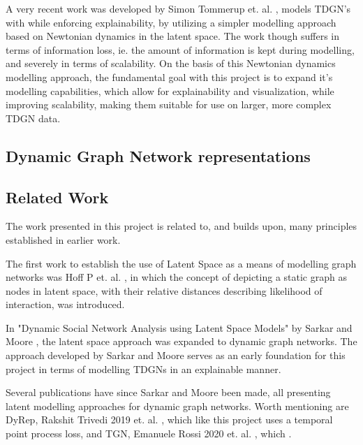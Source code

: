 A very recent work was developed by Simon Tommerup et. al. \cite{Tommerup2021LearningNetworks}, models TDGN's with while enforcing explainability, by utilizing a simpler modelling approach based on Newtonian dynamics in the latent space.
The work though suffers in terms of information loss, ie. the amount of information is kept during modelling, and severely in terms of scalability.
On the basis of this Newtonian dynamics modelling approach, the fundamental goal with this project is to expand it's modelling capabilities, which allow for explainability and visualization, while improving scalability, making them suitable for use on larger, more complex TDGN data.



\subsection{Dynamic Graph Network representations}
\label{sec:Intro:DynamicGraphNetworks}




\subsection{Related Work}
\label{sec:Intro:RelatedWork}
The work presented in this project is related to, and builds upon, many principles established in earlier work.

The first work to establish the use of Latent Space as a means of modelling graph networks was Hoff P et. al. \cite{Hoff2002LatentAnalysis}, in which the concept of depicting a static graph as nodes in latent space, with their relative distances describing likelihood of interaction, was introduced.

In "Dynamic Social Network Analysis using Latent Space Models" by Sarkar and Moore \cite{Sarkar2005DynamicModels}, the latent space approach was expanded to dynamic graph networks.
The approach developed by Sarkar and Moore serves as an early foundation for this project in terms of modelling TDGNs in an explainable manner.

Several publications have since Sarkar and Moore been made, all presenting latent modelling approaches for dynamic graph networks. 
Worth mentioning are DyRep, Rakshit Trivedi 2019 et. al. \cite{TrivediDYREP:GRAPHS}, which like this project uses a temporal point process loss, and TGN, Emanuele Rossi 2020 et. al. \cite{RossiTEMPORALGRAPHS}, which .
 
